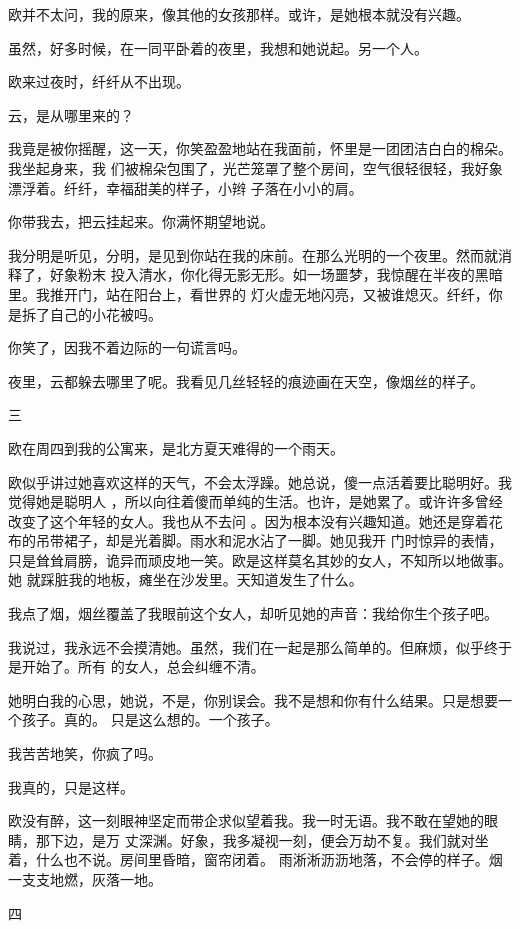 \documentclass[12pt,a4paper]{article}
\newcommand{\subpart}[1]{
	\begingroup \par
	\vspace{1ex} \centering #1
	\par \endgroup \nopagebreak[4]
}
\begin{document}
		欧并不太问，我的原来，像其他的女孩那样。或许，是她根本就没有兴趣。\par
		虽然，好多时候，在一同平卧着的夜里，我想和她说起。另一个人。\par
		欧来过夜时，纤纤从不出现。\par
		云，是从哪里来的？

		我竟是被你摇醒，这一天，你笑盈盈地站在我面前，怀里是一团团洁白白的棉朵。我坐起身来，我
	们被棉朵包围了，光芒笼罩了整个房间，空气很轻很轻，我好象漂浮着。纤纤，幸福甜美的样子，小辫
	子落在小小的肩。

		你带我去，把云挂起来。你满怀期望地说。

		我分明是听见，分明，是见到你站在我的床前。在那么光明的一个夜里。然而就消释了，好象粉末
	投入清水，你化得无影无形。如一场噩梦，我惊醒在半夜的黑暗里。我推开门，站在阳台上，看世界的
	灯火虚无地闪亮，又被谁熄灭。纤纤，你是拆了自己的小花被吗。

		你笑了，因我不着边际的一句谎言吗。\par
		夜里，云都躲去哪里了呢。我看见几丝轻轻的痕迹画在天空，像烟丝的样子。

		\subpart{三}

		欧在周四到我的公寓来，是北方夏天难得的一个雨天。

		欧似乎讲过她喜欢这样的天气，不会太浮躁。她总说，傻一点活着要比聪明好。我觉得她是聪明人
	，所以向往着傻而单纯的生活。也许，是她累了。或许许多曾经改变了这个年轻的女人。我也从不去问
	。因为根本没有兴趣知道。她还是穿着花布的吊带裙子，却是光着脚。雨水和泥水沾了一脚。她见我开
	门时惊异的表情，只是耸耸肩膀，诡异而顽皮地一笑。欧是这样莫名其妙的女人，不知所以地做事。她
	就踩脏我的地板，瘫坐在沙发里。天知道发生了什么。

		我点了烟，烟丝覆盖了我眼前这个女人，却听见她的声音：我给你生个孩子吧。

		我说过，我永远不会摸清她。虽然，我们在一起是那么简单的。但麻烦，似乎终于是开始了。所有
	的女人，总会纠缠不清。

		她明白我的心思，她说，不是，你别误会。我不是想和你有什么结果。只是想要一个孩子。真的。
	只是这么想的。一个孩子。

		我苦苦地笑，你疯了吗。\par
		我真的，只是这样。

		欧没有醉，这一刻眼神坚定而带企求似望着我。我一时无语。我不敢在望她的眼睛，那下边，是万
	丈深渊。好象，我多凝视一刻，便会万劫不复。我们就对坐着，什么也不说。房间里昏暗，窗帘闭着。
	雨淅淅沥沥地落，不会停的样子。烟一支支地燃，灰落一地。

		\subpart{四}
\end{document}
